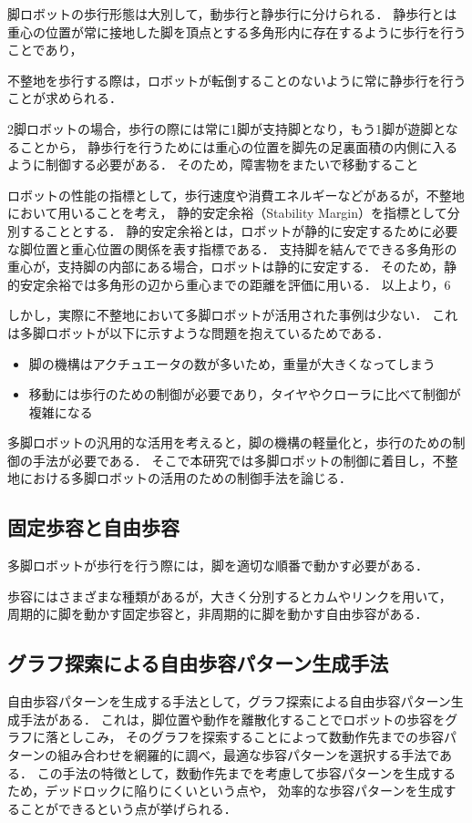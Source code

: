 脚ロボットの歩行形態は大別して，動歩行と静歩行に分けられる．
静歩行とは重心の位置が常に接地した脚を頂点とする多角形内に存在するように歩行を行うことであり，

不整地を歩行する際は，ロボットが転倒することのないように常に静歩行を行うことが求められる．

2脚ロボットの場合，歩行の際には常に1脚が支持脚となり，もう1脚が遊脚となることから，
静歩行を行うためには重心の位置を脚先の足裏面積の内側に入るように制御する必要がある．
そのため，障害物をまたいで移動すること

ロボットの性能の指標として，歩行速度や消費エネルギーなどがあるが，不整地において用いることを考え，
静的安定余裕\cite{Hirose_Static_stability_criterion}（Stability Margin）を指標として分別することとする．
静的安定余裕とは，ロボットが静的に安定するために必要な脚位置と重心位置の関係を表す指標である．
支持脚を結んでできる多角形の重心が，支持脚の内部にある場合，ロボットは静的に安定する．
そのため，静的安定余裕では多角形の辺から重心までの距離を評価に用いる．
以上より，6

しかし，実際に不整地において多脚ロボットが活用された事例は少ない．
これは多脚ロボットが以下に示すような問題を抱えているためである\cite{Locomotion_for_difficult_terrain}．

\begin{itemize}
  \item 脚の機構はアクチュエータの数が多いため，重量が大きくなってしまう
  \item 移動には歩行のための制御が必要であり，タイヤやクローラに比べて制御が複雑になる
\end{itemize}

多脚ロボットの汎用的な活用を考えると，脚の機構の軽量化と，歩行のための制御の手法が必要である．
そこで本研究では多脚ロボットの制御に着目し，不整地における多脚ロボットの活用のための制御手法を論じる．

\subsection{固定歩容と自由歩容}
多脚ロボットが歩行を行う際には，脚を適切な順番で動かす必要がある．

歩容にはさまざまな種類があるが，大きく分別するとカムやリンクを用いて，
周期的に脚を動かす固定歩容と，非周期的に脚を動かす自由歩容がある．

\subsection{グラフ探索による自由歩容パターン生成手法}
自由歩容パターンを生成する手法として，グラフ探索による自由歩容パターン生成手法がある．
これは，脚位置や動作を離散化することでロボットの歩容をグラフに落としこみ，
そのグラフを探索することによって数動作先までの歩容パターンの組み合わせを網羅的に調べ，最適な歩容パターンを選択する手法である．
この手法の特徴として，数動作先までを考慮して歩容パターンを生成するため，デッドロックに陥りにくいという点や，
効率的な歩容パターンを生成することができるという点が挙げられる．

